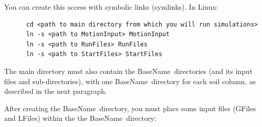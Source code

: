 \documentclass[letterpaper,11pt]{article}
\newcommand{\BaseName}{\textsf{BaseName}}
\newcommand{\GFile}{\textsf{GFile}}
\newcommand{\LFile}{\textsf{LFile}}
\begin{document}
    You can create this access with symbolic links (symlinks).
    In Linux:
    \begin{verbatim}
      cd <path to main directory from which you will run simulations>
      ln -s <path to MotionInput> MotionInput
      ln -s <path to RunFiles> RunFiles
      ln -s <path to StartFiles> StartFiles
    \end{verbatim}
    The main directory must also contain the
    \BaseName\ directories (and its input
    files and sub-di\-rec\-tor\-ies),
    with one \BaseName\ directory
    for each soil column, as described in the next
    paragraph.
    \par
    After creating the \BaseName\ directory,
    you must place some %
    input files (\GFile s and \LFile s) within the
    the \BaseName\ directory:
\end{document}
